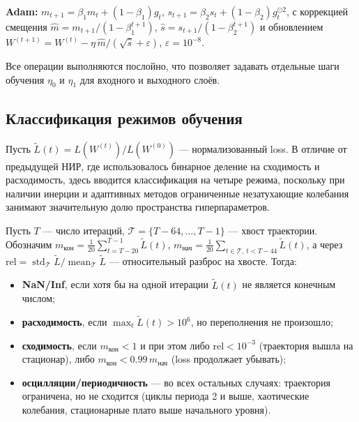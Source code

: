 \smallskip
\noindent\textbf{Adam:}\quad
$m_{t+1} = \beta_1 m_t + (1-\beta_1) g_t$,\quad
$s_{t+1} = \beta_2 s_t + (1-\beta_2) g_t^{\odot 2}$, с коррекцией смещения
$\hat m = m_{t+1}/(1-\beta_1^{t+1})$, $\hat s = s_{t+1}/(1-\beta_2^{t+1})$ и
обновлением $W^{(t+1)} = W^{(t)} - \eta\,\hat m/(\sqrt{\hat s}+\varepsilon)$,
$\varepsilon = 10^{-8}$.

Все операции выполняются послойно, что позволяет задавать отдельные шаги
обучения $\eta_0$ и $\eta_1$ для входного и выходного слоёв.

\subsection{Классификация режимов обучения}

Пусть $\tilde L(t) = L(W^{(t)})/L(W^{(0)})$ --- нормализованный loss. В отличие
от предыдущей НИР, где использовалось бинарное деление на сходимость и
расходимость, здесь вводится классификация на четыре режима, поскольку при
наличии инерции и адаптивных методов ограниченные незатухающие колебания
занимают значительную долю пространства гиперпараметров.

\begin{definition}[Режимы]\label{def:regimes}
Пусть $T$ --- число итераций, $\mathcal{T}=\{T-64,\dots,T-1\}$ --- хвост
траектории. Обозначим
$m_{\text{кон}} = \frac{1}{20}\sum_{t=T-20}^{T-1}\tilde L(t)$,
$m_{\text{нач}} = \frac{1}{20}\sum_{t\in\mathcal{T},\,t<T-44}\tilde L(t)$,
а через $\mathrm{rel} = \operatorname{std}_{\mathcal{T}}\tilde L / \operatorname{mean}_{\mathcal{T}}\tilde L$ ---
относительный разброс на хвосте. Тогда:
\begin{itemize}[leftmargin=*,topsep=2pt,itemsep=1pt]
  \item \textbf{NaN/Inf}, если хотя бы на одной итерации $\tilde L(t)$ не является
        конечным числом;
  \item \textbf{расходимость}, если $\max_t \tilde L(t) > 10^{6}$, но переполнения
        не произошло;
  \item \textbf{сходимость}, если $m_{\text{кон}} < 1$ и при этом либо
        $\mathrm{rel} < 10^{-3}$ (траектория вышла на стационар), либо
        $m_{\text{кон}} < 0.99\, m_{\text{нач}}$ (loss продолжает убывать);
  \item \textbf{осцилляции/периодичность} --- во всех остальных случаях:
        траектория ограничена, но не сходится (циклы периода 2 и выше,
        хаотические колебания, стационарные плато выше начального уровня).
\end{itemize}
\end{definition}

